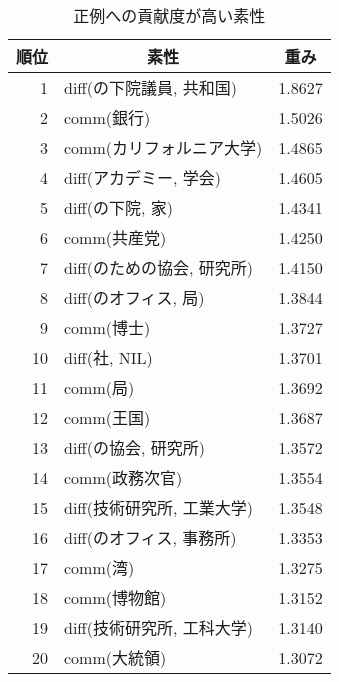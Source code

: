 \begin{table}[htbp]
\caption{正例への貢献度が高い素性}
\label{tab:effective_feats_pos}
\begin{center}
\begin{tabular}{|r|l|c|}\hline
\multicolumn{1}{|c}{順位} & \multicolumn{1}{|c|}{素性} & 重み \\\hline
1 & diff(の下院議員, 共和国) & 1.8627 \\
2 & comm(銀行) & 1.5026 \\
3 & comm(カリフォルニア大学) & 1.4865 \\
4 & diff(アカデミー, 学会) & 1.4605 \\
5 & diff(の下院, 家) & 1.4341 \\
6 & comm(共産党) & 1.4250 \\
7 & diff(のための協会, 研究所) & 1.4150 \\
8 & diff(のオフィス, 局) & 1.3844 \\
9 & comm(博士) & 1.3727 \\
10 & diff(社, NIL) & 1.3701 \\
11 & comm(局) & 1.3692 \\
12 & comm(王国) & 1.3687 \\
13 & diff(の協会, 研究所) & 1.3572 \\
14 & comm(政務次官) & 1.3554 \\
15 & diff(技術研究所, 工業大学) & 1.3548 \\
16 & diff(のオフィス, 事務所) & 1.3353 \\
17 & comm(湾) & 1.3275 \\
18 & comm(博物館) & 1.3152 \\
19 & diff(技術研究所, 工科大学) & 1.3140 \\
20 & comm(大統領) & 1.3072 \\\hline
\end{tabular}
\end{center}
\end{table}
